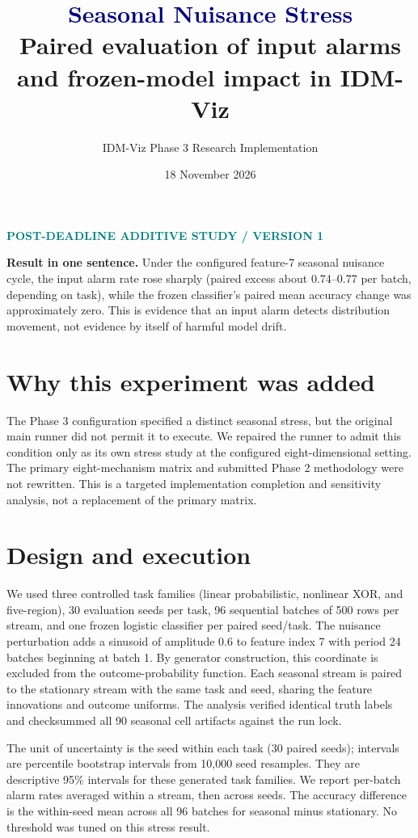 \documentclass[11pt]{article}
\title{\vspace{-1.2em}\textcolor{navy}{Seasonal Nuisance Stress}\\[.25em]\large Paired evaluation of input alarms and frozen-model impact in IDM-Viz}
\author{IDM-Viz Phase 3 Research Implementation}
\date{18 November 2026}
\newcommand{\StudyTag}{\textcolor{teal}{\small\bfseries POST-DEADLINE ADDITIVE STUDY \quad / \quad VERSION 1}}
\begin{document}
\maketitle\vspace{-1.2em}\begin{center}\StudyTag\end{center}
\begin{takeaway}
\textbf{Result in one sentence.} Under the configured feature-7 seasonal nuisance cycle, the input alarm rate rose sharply (paired excess about 0.74--0.77 per batch, depending on task), while the frozen classifier's paired mean accuracy change was approximately zero. This is evidence that an input alarm detects distribution movement, not evidence by itself of harmful model drift.
\end{takeaway}
\section{Why this experiment was added}
The Phase 3 configuration specified a distinct seasonal stress, but the original main runner did not permit it to execute. We repaired the runner to admit this condition only as its own stress study at the configured eight-dimensional setting. The primary eight-mechanism matrix and submitted Phase 2 methodology were not rewritten. This is a targeted implementation completion and sensitivity analysis, not a replacement of the primary matrix.

\section{Design and execution}
We used three controlled task families (linear probabilistic, nonlinear XOR, and five-region), 30 evaluation seeds per task, 96 sequential batches of 500 rows per stream, and one frozen logistic classifier per paired seed/task. The nuisance perturbation adds a sinusoid of amplitude 0.6 to feature index 7 with period 24 batches beginning at batch 1. By generator construction, this coordinate is excluded from the outcome-probability function. Each seasonal stream is paired to the stationary stream with the same task and seed, sharing the feature innovations and outcome uniforms. The analysis verified identical truth labels and checksummed all 90 seasonal cell artifacts against the run lock.

The unit of uncertainty is the seed within each task (30 paired seeds); intervals are percentile bootstrap intervals from 10,000 seed resamples. They are descriptive 95\% intervals for these generated task families. We report per-batch alarm rates averaged within a stream, then across seeds. The accuracy difference is the within-seed mean across all 96 batches for seasonal minus stationary. No threshold was tuned on this stress result.
\end{document}
